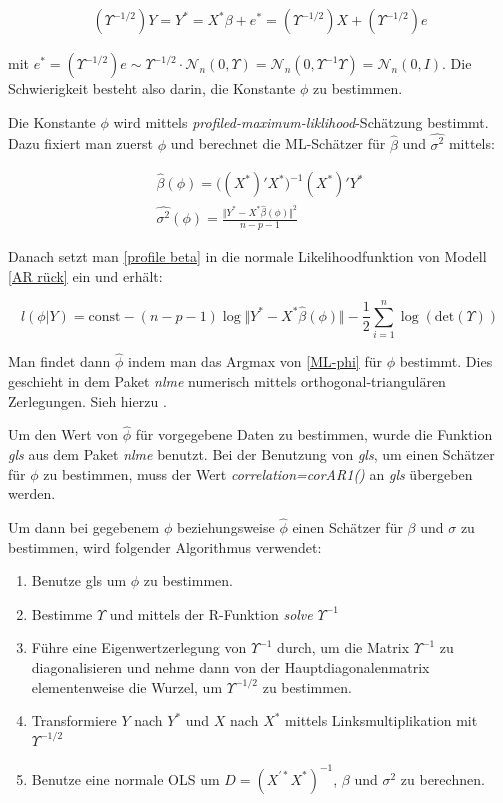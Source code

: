 \documentclass[12pt,a4paper]{article}
\theoremstyle{definition}
\theoremstyle{definition}
\theoremstyle{definition}
\theoremstyle{definition}
\begin{document}
\begin{align} \label{AR rück}
(\Upsilon^{-1/2})Y = Y^{*} = X^{*} \beta + e^{*} = (\Upsilon^{-1/2})X + (\Upsilon^{-1/2})e
\end{align}

mit $e^{*} = (\Upsilon^{-1/2})e \sim \Upsilon^{-1/2} \cdot \mathscr{N}_{n}(0,\Upsilon) = \mathscr{N}_{n}(0,\Upsilon^{-1}\Upsilon) = \mathscr{N}_{n}(0,I)$. Die Schwierigkeit besteht also darin, die Konstante $\phi$ zu bestimmen. 

Die Konstante $\phi$ wird mittels \textit{profiled-maximum-liklihood}-Schätzung bestimmt. Dazu fixiert man zuerst $\phi$ und berechnet die ML-Schätzer für $\hat{\beta}$ und $\widehat{\sigma^2}$ mittels:

\begin{eqnarray}
\label{profile beta}
\hat{\beta}(\phi) =  \big( (X^*)' X^* \big)^{-1} (X^*)' Y^* \\
\widehat{\sigma^2}(\phi) = \frac{\Vert Y^* - X^* \hat{\beta}(\phi) \Vert^2}{n-p-1} \nonumber
\end{eqnarray}

Danach setzt man \eqref{profile beta} in die normale Likelihoodfunktion von Modell \eqref{AR rück} ein und erhält:

\begin{equation}\label{ML-phi}
l(\phi|Y) = \text{const} - (n-p-1) \log \Vert Y^* - X^* \hat{\beta}(\phi) \Vert - \frac{1}{2} \sum^n_{i=1} \log( \text{det} (\Upsilon) )
\end{equation}

Man findet dann $\hat{\phi}$ indem man das Argmax von \eqref{ML-phi} für $\phi$ bestimmt. Dies geschieht in dem Paket \textit{nlme} numerisch mittels orthogonal-triangulären Zerlegungen. Sieh hierzu \cite[68-75]{Pinheiro00}.

Um den Wert von $\hat{\phi}$ für vorgegebene Daten zu bestimmen, wurde die Funktion \textit{gls} aus dem Paket \textit{nlme} benutzt. Bei der Benutzung von \textit{gls}, um einen Schätzer für $\phi$ zu bestimmen, muss der Wert \textit{correlation=corAR1()} an \textit{gls} übergeben werden.

Um dann bei gegebenem $\phi$ beziehungsweise $\hat{\phi}$ einen Schätzer für $\beta$ und $\sigma$ zu bestimmen, wird folgender Algorithmus verwendet:

\begin{enumerate}
\item Benutze gls um $\phi$ zu bestimmen.
\item Bestimme $\Upsilon$ und mittels der R-Funktion \textit{solve} $\Upsilon^{-1}$ 
\item Führe eine Eigenwertzerlegung von $\Upsilon^{-1}$ durch, um die Matrix $\Upsilon^{-1}$ zu diagonalisieren und nehme dann von der Hauptdiagonalenmatrix elementenweise die Wurzel, um $\Upsilon^{-1/2}$ zu bestimmen.
\item Transformiere $Y$ nach $Y^{*}$ und $X$ nach $X^{*}$ mittels Linksmultiplikation mit $\Upsilon^{-1/2}$
\item Benutze eine normale OLS um $D=(X^{'*}X^{*})^{-1}$, $\beta$ und $\sigma^2$ zu berechnen.
\end{enumerate}
\end{document}
